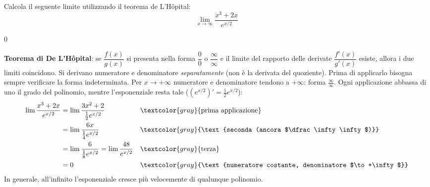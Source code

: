 \begin{question}[ID=1.4, subtitle={De L'Hôpital: $\lim_{x\to+\infty}(x^3+2x)/e^{x/2}$}, tags={de l'hospital, limiti}, difficulty=media]
Calcola il seguente limite utilizzando il teorema de L'Hôpital:
\[
\lim_{x \to \infty} \frac{x^3 + 2x}{e^{x/2}}
\]
\begin{solution}
$0$
\end{solution}
\begin{explanation}
\textbf{Teorema di De L'Hôpital}: se $\dfrac{f(x)}{g(x)}$ si presenta nella forma $\dfrac00$ o $\dfrac\infty\infty$ e il limite del rapporto delle derivate $\dfrac{f'(x)}{g'(x)}$ esiste, allora i due limiti coincidono. Si derivano numeratore e denominatore \emph{separatamente} (non è la derivata del quoziente). Prima di applicarlo bisogna sempre verificare la forma indeterminata.
Per $x\to+\infty$ numeratore e denominatore tendono a $+\infty$: forma $\tfrac\infty\infty$. Ogni applicazione abbassa di uno il grado del polinomio, mentre l'esponenziale resta tale ($\left(e^{x/2}\right)'=\tfrac12e^{x/2}$):
\[\begin{aligned}
\lim\dfrac{x^3+2x}{e^{x/2}} &= \lim\dfrac{3x^2+2}{\frac12e^{x/2}} && \textcolor{gray}{\text{prima applicazione}}\\
&= \lim\dfrac{6x}{\frac14e^{x/2}} && \textcolor{gray}{\text{seconda (ancora $\dfrac\infty\infty$)}}\\
&= \lim\dfrac{6}{\frac18e^{x/2}}=\lim\dfrac{48}{e^{x/2}} && \textcolor{gray}{\text{terza}}\\
&= 0 && \textcolor{gray}{\text{numeratore costante, denominatore $\to+\infty$}}
\end{aligned}\]
In generale, all'infinito l'esponenziale cresce più velocemente di qualunque polinomio.
\end{explanation}
\end{question}


